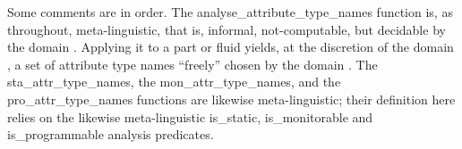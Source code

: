 \mnewfoil
{}


      

\mnewfoil
\noindent
\begynd
\pind Some comments are in order.
\begynd
\pind The \textsf{analyse\_attribute\_type\_names} function is, as
      throughout, meta-linguistic, that is, informal, not-computable,
      but decidable by the domain . Applying it
      to a part or fluid yields, at the discretion of the domain
      , a set of attribute type names ``freely''
      chosen by the domain .
\pind The \textsf{sta\_attr\_type\_names}, the
          \textsf{mon\_attr\_type\_names}, and the
          \textsf{pro\_attr\_type\_names} functions are likewise
      meta-linguistic; their definition here relies on the
      likewise meta-linguistic \textsf{is\_static,
      is\_monitorable} and \textsf{is\_programmable} analysis predicates.
\afslut
\afslut

